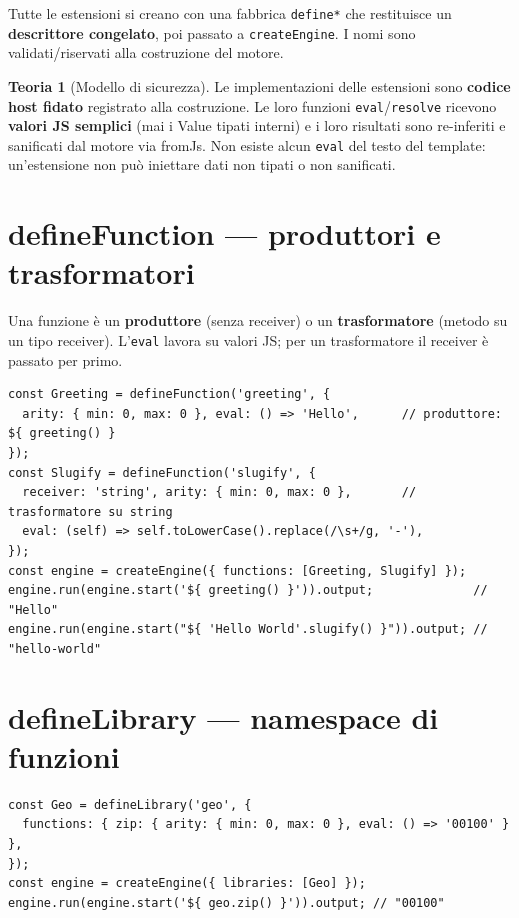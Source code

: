 \documentclass[11pt,a4paper]{book}
\let\code\lstinline
\newcommand{\ic}[1]{{\ttfamily #1}}
\theoremstyle{definition}
\newtheorem*{teoria}{Teoria}
\begin{document}
{{{{Tutte le estensioni si creano con una fabbrica \code|define*| che restituisce un
\textbf{descrittore congelato}, poi passato a \code|createEngine|. I nomi sono
validati/riservati alla costruzione del motore.

\begin{teoria}[Modello di sicurezza]
Le implementazioni delle estensioni sono \textbf{codice host fidato} registrato alla
costruzione. Le loro funzioni \code|eval|/\code|resolve| ricevono \textbf{valori JS
semplici} (mai i \ic{Value} tipati interni) e i loro risultati sono re-inferiti e
sanificati dal motore via \ic{fromJs}. Non esiste alcun \code|eval| del testo del
template: un'estensione non può iniettare dati non tipati o non sanificati.
\end{teoria}

\section{defineFunction --- produttori e trasformatori}

Una funzione è un \textbf{produttore} (senza \ic{receiver}) o un
\textbf{trasformatore} (metodo su un tipo \ic{receiver}). L'\code|eval| lavora su
valori JS; per un trasformatore il receiver è passato per primo.

\begin{lstlisting}
const Greeting = defineFunction('greeting', {
  arity: { min: 0, max: 0 }, eval: () => 'Hello',      // produttore: ${ greeting() }
});
const Slugify = defineFunction('slugify', {
  receiver: 'string', arity: { min: 0, max: 0 },       // trasformatore su string
  eval: (self) => self.toLowerCase().replace(/\s+/g, '-'),
});
const engine = createEngine({ functions: [Greeting, Slugify] });
engine.run(engine.start('${ greeting() }')).output;              // "Hello"
engine.run(engine.start("${ 'Hello World'.slugify() }")).output; // "hello-world"
\end{lstlisting}

\section{defineLibrary --- namespace di funzioni}

\begin{lstlisting}
const Geo = defineLibrary('geo', {
  functions: { zip: { arity: { min: 0, max: 0 }, eval: () => '00100' } },
});
const engine = createEngine({ libraries: [Geo] });
engine.run(engine.start('${ geo.zip() }')).output; // "00100"
\end{lstlisting}

}}}}
\end{document}

